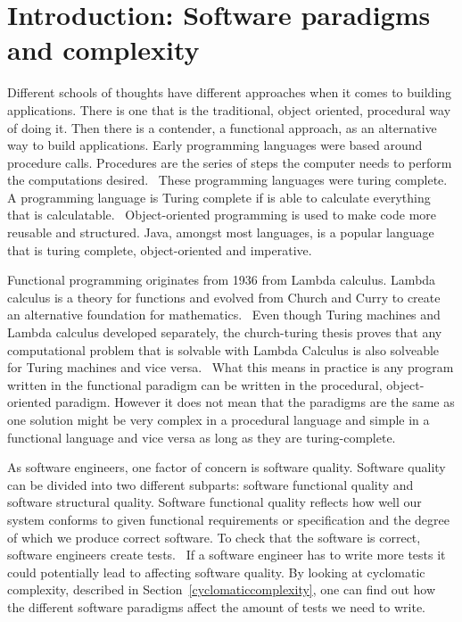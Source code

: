 \chapter{Introduction: Software paradigms and complexity}\label{introduction}

Different schools of thoughts have different approaches when it comes to
building applications. There is one that is the traditional, object oriented,
procedural way of doing it. Then there is a contender, a functional approach, as
an alternative way to build applications.  Early programming languages were
based around procedure calls. Procedures are the series of steps the computer
needs to perform the computations desired.~\cite{proceduralprogramming} These
programming languages were turing complete. A programming language is Turing
complete if is able to calculate everything that is
calculatable.~\cite{turingmachine} Object-oriented programming is used to make
code more reusable and structured. Java, amongst most languages, is a popular
language that is turing complete, object-oriented and imperative.~\cite{java} 

Functional programming originates from 1936 from Lambda calculus. Lambda
calculus is a theory for functions and evolved from Church and Curry to create
an alternative foundation for mathematics.~\cite{Turner} Even though Turing
machines and Lambda calculus developed separately, the church-turing thesis
proves that any computational problem that is solvable with Lambda Calculus is
also solveable for Turing machines and vice versa.~\cite{sep-church-turing} What
this means in practice is any program written in the functional paradigm can be
written in the procedural, object-oriented paradigm. However it does not mean
that the paradigms are the same as one solution might be very complex in a
procedural language and simple in a functional language and vice versa as long
as they are turing-complete.

As software engineers, one factor of concern is software quality. Software
quality can be divided into two different subparts: software functional quality
and software structural quality. Software functional quality reflects how well
our system conforms to given functional requirements or specification and the
degree of which we produce correct software.  To check that the software is
correct, software engineers create tests.~\cite{Pressman:2004:SEP:994110} If a
software engineer has to write more tests it could potentially lead to affecting
software quality.  By looking at cyclomatic complexity, described in
Section~\ref{cyclomaticcomplexity}, one can find out how the different software
paradigms affect the amount of tests we need to write.  

